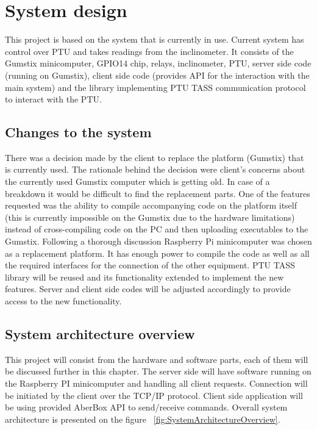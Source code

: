 \chapter{System design}
This project is based on the system that is currently in use. Current system has control over PTU and takes readings from the inclinometer. It consists of the Gumstix minicomputer, GPIO14 chip, relays, inclinometer, PTU, server side code (running on Gumstix), client side code (provides API for the interaction with the main system) and the library implementing PTU TASS communication protocol to interact with the PTU.

\section{Changes to the system}
There was a decision made by the client to replace the platform (Gumstix) that is currently used. The rationale behind the decision were client's concerns about the currently used Gumstix computer which is getting old. In case of a breakdown it would be difficult to find the replacement parts. One of the features requested was the ability to compile accompanying code on the platform itself (this is currently impossible on the Gumstix due to the hardware limitations) instead of cross-compiling code on the PC and then uploading executables to the Gumstix. Following a thorough discussion Raspberry Pi minicomputer was chosen as a replacement platform. It has enough power to compile the code as well as all the required interfaces for the connection of the other equipment. PTU TASS library will be reused and its functionality extended to implement the new features. Server and client side codes will be adjusted accordingly to provide access to the new functionality.

\section{System architecture overview}
This project will consist from the hardware and software parts, each of them will be discussed further in this chapter. The server side will have software running on the Raspberry PI minicomputer and handling all client requests. Connection will be initiated by the client over the TCP/IP protocol. Client side application will be using provided AberBox API to send/receive commands. Overall system architecture is presented on the figure ~\ref{fig:SystemArchitectureOverview}.

